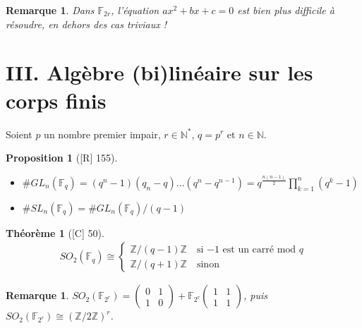 \documentclass[10pt, a4paper, parskip=full, twoside, twocolumn]{report}
\newtheorem{theorem}[definition]{Théorème}
\newtheorem{proposition}[definition]{Proposition}
\newtheorem{remark}[definition]{Remarque}
\newcommand{\IN}{\mathbb{N}}
\newcommand{\IZ}{\mathbb{Z}}
\newcommand{\IF}{\mathbb{F}}
\begin{document}
\begin{remark}
	Dans $\IF_{2r}$, l'équation $ax^2+bx+c=0$ est bien plus difficile à résoudre, en dehors des cas triviaux !
\end{remark}

\section*{III. Algèbre (bi)linéaire sur les corps finis}

\textcolor{paragraphtext}{Soient $p$ un nombre premier impair, $r\in\IN^*$, $q = p^r$ et $n\in\IN$.}

\begin{proposition}[\textnormal{[R] 155}]
	\begin{itemize}
		\item $\# GL_n(\IF_q) = (q^n-1)(q_n - q)\dots (q^n-q^{n-1}) = q^{\frac{n(n-1)}{2}}\prod_{k=1}^{n}(q^k-1)$
		\item $\# SL_n(\IF_q) = \#GL_n(\IF_q)/(q-1)$
	\end{itemize}
\end{proposition}

\begin{tcolorbox}[
    breakable, %
    colback=developpement, %
    colframe=gray!0!black, %
    boxrule=0pt, %
    arc=1mm, %
	boxsep=0pt,
	left=0pt, right=0pt, top=0pt, bottom=0pt
]
\begin{theorem}[\textnormal{[C] 50}]
	\label{123dev2}
	\begin{align*}
		SO_2(\IF_q)\cong \begin{cases}
			\IZ/(q-1)\IZ\quad\text{si $-1$ est un carré mod $q$} \\
			\IZ/(q+1)\IZ\quad\text{sinon}
		\end{cases}
	\end{align*}
\end{theorem}
\end{tcolorbox}

\begin{remark}
	$SO_2(\IF_{2^r}) = \begin{pmatrix}
		0 & 1 \\
		1 & 0
	\end{pmatrix} + \IF_{2^r}\begin{pmatrix}
		1 & 1 \\ 1 & 1
	\end{pmatrix}$, puis $SO_2(\IF_{2^r})\cong \left(\IZ/2\IZ\right)^r$.
\end{remark}
\end{document}
